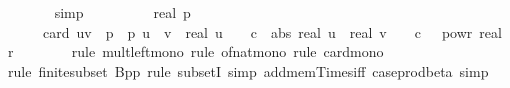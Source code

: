 \begin{isabellebody}
\ \ \ \ \ \ \isamarkupfalse%
\ simp\isanewline
\ \ \ \ \isamarkupfalse%
\ \isamarkupfalse%
\ {\isachardoublequoteopen}{\isachardot}{\kern0pt}{\isachardot}{\kern0pt}{\isachardot}{\kern0pt}\ {\isasymle}\ {}{\isacharslash}{\kern0pt}{\isacharparenleft}{\kern0pt}real\ p{\isacharparenright}{\kern0pt}\ {\isacharasterisk}{\kern0pt}\ \isanewline
\ \ \ \ \ \ card\ {\isacharbraceleft}{\kern0pt}{\isacharparenleft}{\kern0pt}u{\isacharcomma}{\kern0pt}v{\isacharparenright}{\kern0pt}\ {\isasymin}\ {\isacharbraceleft}{\kern0pt}{}{\isachardot}{\kern0pt}{\isachardot}{\kern0pt}{\isacharless}{\kern0pt}p{\isacharbraceright}{\kern0pt}\ {\isasymtimes}\ {\isacharbraceleft}{\kern0pt}{}{\isachardot}{\kern0pt}{\isachardot}{\kern0pt}{\isacharless}{\kern0pt}p{\isacharbraceright}{\kern0pt}{\isachardot}{\kern0pt}\ u\ {\isasymnoteq}\ v\ {\isasymand}\ real\ u\ {\isasymle}\ {}\ {\isacharasterisk}{\kern0pt}\ c\ {\isasymand}\ abs\ {\isacharparenleft}{\kern0pt}real\ u\ {\isacharminus}{\kern0pt}\ real\ v{\isacharparenright}{\kern0pt}\ {\isasymle}\ {}\ {\isacharasterisk}{\kern0pt}\ c\ {\isacharasterisk}{\kern0pt}\ {}\ powr\ {\isacharparenleft}{\kern0pt}{\isacharminus}{\kern0pt}real\ r{\isacharparenright}{\kern0pt}{\isacharbraceright}{\kern0pt}{\isachardoublequoteclose}\isanewline
\ \ \ \ \ \ \isamarkupfalse%
\ {\isacharparenleft}{\kern0pt}rule\ mult{\isacharunderscore}{\kern0pt}left{\isacharunderscore}{\kern0pt}mono{\isacharcomma}{\kern0pt}\ rule\ of{\isacharunderscore}{\kern0pt}nat{\isacharunderscore}{\kern0pt}mono{\isacharcomma}{\kern0pt}\ rule\ card{\isacharunderscore}{\kern0pt}mono{\isacharparenright}{\kern0pt}\isanewline
\ \ \ \ \ \ \ \ \isamarkupfalse%
\ {\isacharparenleft}{\kern0pt}rule\ finite{\isacharunderscore}{\kern0pt}subset{\isacharbrackleft}{\kern0pt}\ B{\isacharequal}{\kern0pt}{\isachardoublequoteopen}{\isacharbraceleft}{\kern0pt}{}{\isachardot}{\kern0pt}{\isachardot}{\kern0pt}{\isacharless}{\kern0pt}p{\isacharbraceright}{\kern0pt}{\isasymtimes}{\isacharbraceleft}{\kern0pt}{}{\isachardot}{\kern0pt}{\isachardot}{\kern0pt}{\isacharless}{\kern0pt}p{\isacharbraceright}{\kern0pt}{\isachardoublequoteclose}{\isacharbrackright}{\kern0pt}{\isacharcomma}{\kern0pt}\ rule\ subsetI{\isacharcomma}{\kern0pt}\ simp\ add{\isacharcolon}{\kern0pt}mem{\isacharunderscore}{\kern0pt}Times{\isacharunderscore}{\kern0pt}iff\ case{\isacharunderscore}{\kern0pt}prod{\isacharunderscore}{\kern0pt}beta{\isacharcomma}{\kern0pt}\ simp{\isacharparenright}{\kern0pt}\isanewline

\end{isabellebody}

